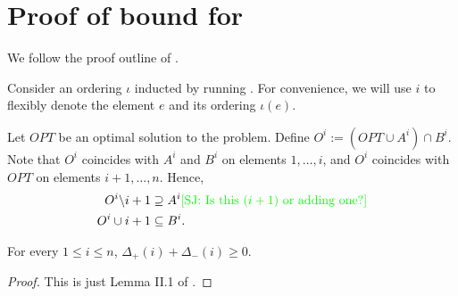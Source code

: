\section{Proof of bound for \hogwild{}}
\label{app:proofhogwild}


We follow the proof outline of \cite{buchbinder2012}.

Consider an ordering $\iota$ inducted by running \hogwild{}.
For convenience, we will use $i$ to flexibly denote the element $e$ and its ordering $\iota(e)$.

Let $OPT$ be an optimal solution to the problem.
Define $O^i := (OPT \cup A^i) \cap B^i$.
Note that $O^i$ coincides with $A^i$ and $B^i$ on elements $1,\dots,i$, and $O^i$ coincides with $OPT$ on elements $i+1,\dots, n$.
Hence,
\begin{align*}
O^i \backslash i+1 &\supseteq A^i \text{\stef{Is this $(i+1)$ or adding one?}}\\
O^i \cup i+1 &\subseteq B^i.
\end{align*}

\begin{lem}\label{lem:positivesum} For every $1 \leq i \leq n$, $\Delta_+(i) + \Delta_-(i) \geq 0$.
\end{lem}
\begin{proof} This is just Lemma II.1 of \cite{buchbinder2012}.
\end{proof}

